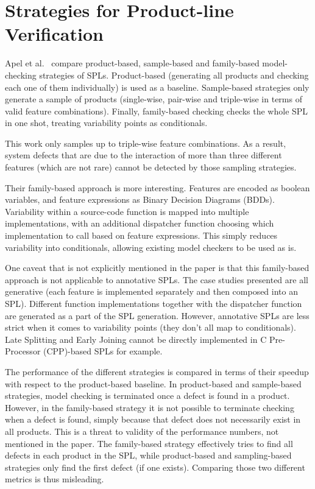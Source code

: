\documentclass[11pt]{article}
\begin{document}
\section{Strategies for Product-line Verification}

Apel et al.~\cite{Apel:2013} compare product-based, sample-based and family-based model-checking strategies of SPLs. Product-based (generating all products and checking each one of them individually) is used as a baseline. Sample-based strategies only generate a sample of products (single-wise, pair-wise and triple-wise in terms of valid feature combinations). Finally, family-based checking checks the whole SPL in one shot, treating variability points as conditionals.

This work only samples up to triple-wise feature combinations. As a result, system defects that are due to the interaction of more than three different features (which are not rare) cannot be detected by those sampling strategies. 

Their family-based approach is more interesting. Features are encoded as boolean variables, and feature expressions as Binary Decision Diagrams (BDDs). Variability within a source-code function is mapped into multiple implementations, with an additional dispatcher function choosing which implementation to call based on feature expressions. This simply reduces variability into conditionals, allowing existing model checkers to be used as is.

One caveat that is not explicitly mentioned in the paper is that this family-based approach is not applicable to annotative SPLs. The case studies presented are all generative (each feature is implemented separately and then composed into an SPL). Different function implementations together with the dispatcher function are generated as a part of the SPL generation. However, annotative SPLs are less strict when it comes to variability points (they don't all map to conditionals). Late Splitting and Early Joining cannot be directly implemented in C Pre-Processor (CPP)-based SPLs for example.

The performance of the different strategies is compared in terms of their speedup with respect to the product-based baseline. In product-based and sample-based strategies, model checking is terminated once a defect is found in a product. However, in the family-based strategy it is not possible to terminate checking when a defect is found, simply because that defect does not necessarily exist in all products. This is a threat to validity of the performance numbers, not mentioned in the paper. The family-based strategy effectively tries to find all defects in each product in the SPL, while product-based and sampling-based strategies only find the first defect (if one exists). Comparing those two different metrics is thus misleading.
\end{document}
